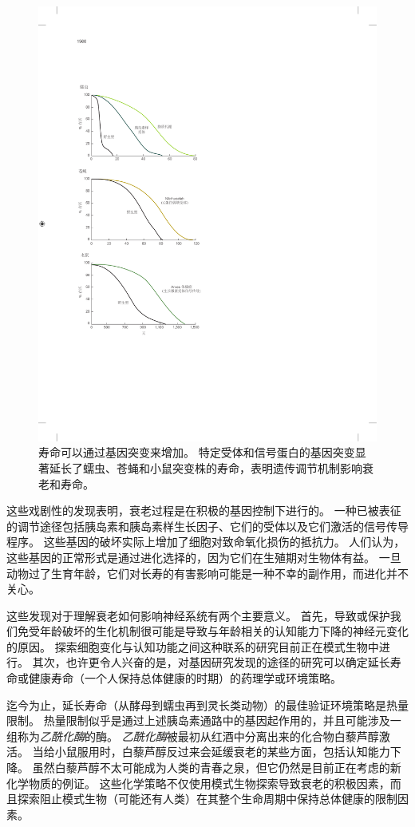\begin{figure}[htbp]
	\centering
	\includegraphics[width=0.76\linewidth]{chap64/fig_64_6}
	\caption{寿命可以通过基因突变来增加。
		特定受体和信号蛋白的基因突变显著延长了蠕虫、苍蝇和小鼠突变株的寿命，表明遗传调节机制影响衰老和寿命\cite{hekimi2003genetics,lin1998extended,brown1996dwarf}。}
	\label{fig:64_6}
\end{figure}


这些戏剧性的发现表明，衰老过程是在积极的基因控制下进行的。
一种已被表征的调节途径包括胰岛素和胰岛素样生长因子、它们的受体以及它们激活的信号传导程序。
这些基因的破坏实际上增加了细胞对致命氧化损伤的抵抗力。
人们认为，这些基因的正常形式是通过进化选择的，因为它们在生殖期对生物体有益。
一旦动物过了生育年龄，它们对长寿的有害影响可能是一种不幸的副作用，而进化并不关心。


这些发现对于理解衰老如何影响神经系统有两个主要意义。
首先，导致或保护我们免受年龄破坏的生化机制很可能是导致与年龄相关的认知能力下降的神经元变化的原因。
探索细胞变化与认知功能之间这种联系的研究目前正在模式生物中进行。
其次，也许更令人兴奋的是，对基因研究发现的途径的研究可以确定延长寿命或健康寿命（一个人保持总体健康的时期）的药理学或环境策略。


迄今为止，延长寿命（从酵母到蠕虫再到灵长类动物）的最佳验证环境策略是热量限制。
热量限制似乎是通过上述胰岛素通路中的基因起作用的，并且可能涉及一组称为\textit{乙酰化酶}的酶。
\textit{乙酰化酶}被最初从红酒中分离出来的化合物白藜芦醇激活。
当给小鼠服用时，白藜芦醇反过来会延缓衰老的某些方面，包括认知能力下降。
虽然白藜芦醇不太可能成为人类的青春之泉，但它仍然是目前正在考虑的新化学物质的例证。
这些化学策略不仅使用模式生物探索导致衰老的积极因素，而且探索阻止模式生物（可能还有人类）在其整个生命周期中保持总体健康的限制因素。



